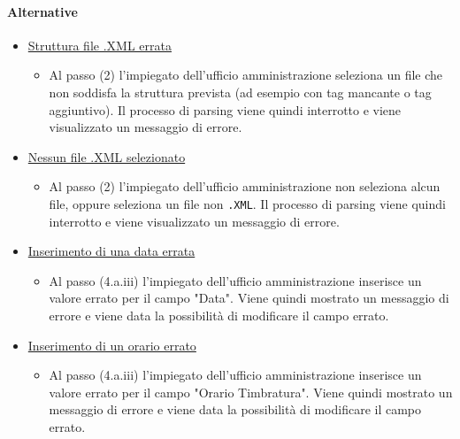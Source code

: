 \paragraph{Alternative}
\begin{itemize}
	\item \underline{Struttura file .XML errata}
		\begin{itemize}
			\item Al passo (2) l'impiegato dell'ufficio amministrazione seleziona un file che non soddisfa la struttura prevista (ad esempio con tag mancante o tag aggiuntivo). Il processo di parsing viene quindi interrotto e viene visualizzato un messaggio di errore.
		\end{itemize}
	\item \underline{Nessun file .XML selezionato}
		\begin{itemize}
			\item Al passo (2) l'impiegato dell'ufficio amministrazione non seleziona alcun file, oppure seleziona un file non \verb|.XML|. Il processo di parsing viene quindi interrotto e viene visualizzato un messaggio di errore.
		\end{itemize}
	\item \underline{Inserimento di una data errata}
		\begin{itemize}
			\item Al passo (4.a.iii) l'impiegato dell'ufficio amministrazione inserisce un valore errato per il campo "Data". Viene quindi mostrato un messaggio di errore e viene data la possibilità di modificare il campo errato.
		\end{itemize}
	\item \underline{Inserimento di un orario errato}
		\begin{itemize}
			\item Al passo (4.a.iii) l'impiegato dell'ufficio amministrazione inserisce un valore errato per il campo "Orario Timbratura". Viene quindi mostrato un messaggio di errore e viene data la possibilità di modificare il campo errato.
		\end{itemize}
\end{itemize}
